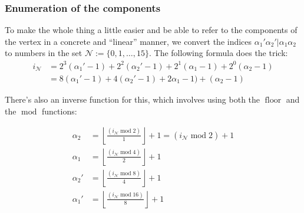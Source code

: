 \documentclass[12pt,a4paper,roman]{article}
\begin{document}
\subsubsection*{Enumeration of the components}
To make the whole thing a little easier and be able to refer to the components of the vertex in a concrete and ``linear'' manner, we convert the indices $\alpha_1'\alpha_2'|\alpha_1\alpha_2$ to numbers in the set $\mathcal{N} := \{0, 1, \dots, 15\}$. The following formula does the trick:
\begin{align}
    i_\mathcal{N} &= 2^3(\alpha_1'-1)+2^2(\alpha_2'-1)+2^1(\alpha_1-1)+2^0(\alpha_2-1)\\
        &= 8(\alpha_1'-1)+4(\alpha_2'-1)+2\alpha_1-1)+(\alpha_2-1)
\end{align}

There's also an inverse function for this, which involves using both the $\operatorname{floor}$
and the $\operatorname{mod}$ functions:

\begin{align}
    \alpha_2 &= \left\lfloor{\frac{(i_\mathcal{N}\operatorname{mod}2)}{1}  }\right\rfloor +1 =(i_\mathcal{N}\operatorname{mod}2) +1\\
    \alpha_1 &= \left\lfloor{\frac{(i_\mathcal{N}\operatorname{mod}4)}{2}  }\right\rfloor +1 \\
    \alpha_2' &= \left\lfloor{\frac{(i_\mathcal{N}\operatorname{mod}8)}{4}  }\right\rfloor +1 \\
    \alpha_1' &= \left\lfloor{\frac{(i_\mathcal{N}\operatorname{mod}16)}{8}  }\right\rfloor +1 
\end{align}
\end{document}

